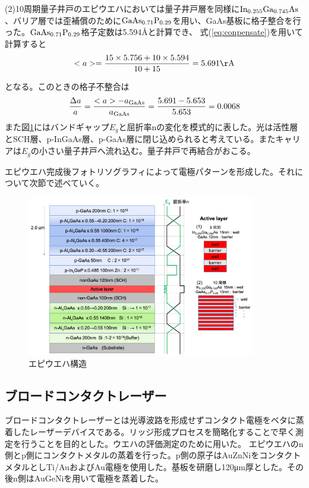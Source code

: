 (2)10周期量子井戸のエピウエハにおいては量子井戸層を同様に$\rm{In_{0.255}Ga_{0.745}As}$、バリア層では歪補償のために$\rm{GaAs_{0.71}P_{0.29}}$を用い、GaAs基板に格子整合を行った。$\rm{GaAs_{0.71}P_{0.29}}$格子定数は5.594\AA と計算でき、
式(\ref{eq:conpensate})を用いて計算すると
\begin{eqnarray}
<a>=\dfrac{15 \times 5.756+10\times 5.594 }{10+15}=5.691\rm{\AA}
\end{eqnarray}

となる。このときの格子不整合は
\begin{eqnarray}
\dfrac{\Delta a}{a}=\dfrac{<a>-a_{\rm{GaAs}}}{a_{\rm{GaAs}}}=\dfrac{5.691-5.653}{5.653}=0.0068
\end{eqnarray}
また図\ref{fig:fig_2_1_wafer_structure}にはバンドギャップ$E_{g}$と屈折率nの変化を模式的に表した。光は活性層とSCH層、p-InGaAs層、p-GaAs層に閉じ込められると考えている。またキャリアは$E_{g}$の小さい量子井戸へ流れ込む。量子井戸で再結合がおこる。

エピウエハ完成後フォトリソグラフィによって電極パターンを形成した。それについて次節で述べていく。
\begin{figure}[h]
	\centering
	\includegraphics[width=10cm]{figure/fig_2_1_wafer_structure}
	\caption{エピウエハ構造}
	\label{fig:fig_2_1_wafer_structure}
\end{figure}
\subsection{ブロードコンタクトレーザー}%
ブロードコンタクトレーザーとは光導波路を形成せずコンタクト電極をベタに蒸着したレーザーデバイスである。リッジ形成プロセスを簡略化することで早く測定を行うことを目的とした。ウエハの評価測定のために用いた。
エピウエハのn側とp側にコンタクトメタルの蒸着を行った。p側の原子はAuZnNiをコンタクトメタルとしTi/AuおよびAu電極を使用した。基板を研磨し120\si{\micro\metre}厚とした。その後n側はAuGeNiを用いて電極を蒸着した。


